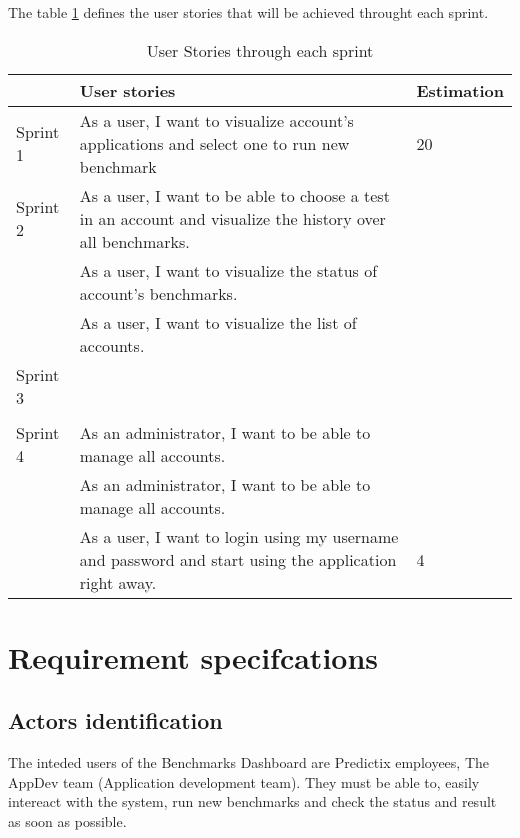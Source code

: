 The table \hyperref[sprints]{\ref{sprints}} defines the user stories that will
be achieved throught each sprint.

\begin{table}[]
\centering
\caption{User Stories through each sprint}
\label{sprints}
\begin{tabular}{|p{2cm}|p{7cm}|p{2cm}|}
\cline{2-3}
                          &  User stories & Estimation \\ \hline
Sprint 1                 &  As a user, I want to visualize account’s applications and select one to run new benchmark &  20\\ \hline
{\multirow{3}{*}{}} Sprint 2 &  As a user, I want to be able to choose a test in an account and visualize the history over all benchmarks.&  \\ \cline{2-3} 
{}                  &  As a user, I want to visualize the status of account’s benchmarks. &  \\ \cline{2-3} 
{}                  & As a user, I want to visualize the list of accounts. &  \\ \hline
{\multirow{2}{*}{}} Sprint 3&  &  \\ \cline{2-3} 
{}                  &  &  \\ \hline
{\multirow{3}{*}{}} Sprint 4 &  As an administrator, I want to be able to manage all accounts. &  \\ \cline{2-3} 
{}                  &  As an administrator, I want to be able to manage all accounts. &  \\ \cline{2-3} 
{}                  & As a user, I want to login using my username and password and start using the application right away. & 4  \\ \hline
\end{tabular}
\end{table}
\section{Requirement specifcations}
\subsection{Actors identification}
The inteded users of the Benchmarks Dashboard are Predictix employees, The
AppDev team (Application development team). They must be able to, easily
intereact with the system, run new benchmarks and check the status and result as
soon as possible.

